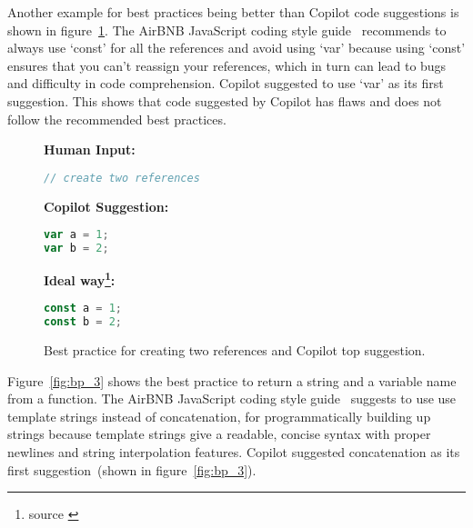 Another example for best practices being better than Copilot code suggestions is shown in figure~\ref{fig:bp_2}. 
The AirBNB JavaScript coding style guide~\cite{airbnb_code} recommends to always use `const' for all the references and avoid using `var' because using `const' ensures that you can’t reassign your references, which in turn can lead to bugs and difficulty in code comprehension.
Copilot suggested to use `var' as its first suggestion.
This shows that code suggested by Copilot has flaws and does not follow the recommended best practices.

\begin{figure}[hbt!]
    \centering
\begin{tcolorbox}[title=Create two references,boxsep=.15mm]
\textbf{Human Input:}
\begin{lstlisting}[language=JavaScript]
// create two references
\end{lstlisting}
\tcbline
\textbf{Copilot Suggestion:}
\begin{lstlisting}[language=JavaScript]
var a = 1;
var b = 2;
\end{lstlisting}
\tcbline
\textbf{Ideal way\footnote{source \cite{airbnb_code}}:}
\begin{lstlisting}[language=JavaScript]
const a = 1;
const b = 2;
\end{lstlisting}
\end{tcolorbox}
    \caption{Best practice for creating two references and Copilot top suggestion.}
    \label{fig:bp_2}
\end{figure}

Figure~\ref{fig:bp_3} shows the best practice to return a string and a variable name from a function. 
The AirBNB JavaScript coding style guide~\cite{airbnb_code} suggests to use use template strings instead of concatenation, for programmatically building up strings because template strings give a readable, concise syntax with proper newlines and string interpolation features.
Copilot suggested concatenation as its first suggestion~(shown in figure~\ref{fig:bp_3}).

